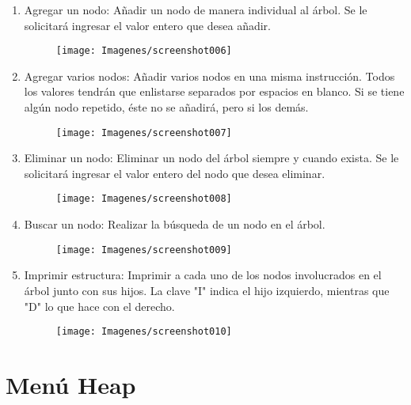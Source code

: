 \documentclass[letterpaper, 11pt]{article}
\begin{document}
	\begin{enumerate}
		\item Agregar un nodo: Añadir un nodo de manera individual al 
		árbol. Se le solicitará ingresar el valor entero que desea añadir.
		
		\begin{figure}[H]
			\centering
			\texttt{[image: Imagenes/screenshot006]}
		\end{figure}
		
		
		\item Agregar varios nodos: Añadir varios nodos en una misma instrucción. Todos los valores tendrán que enlistarse separados por espacios en blanco. Si se tiene algún nodo repetido, éste no se añadirá, pero si los demás.
		
		\begin{figure}[H]
			\centering
			\texttt{[image: Imagenes/screenshot007]}
		\end{figure}
		
		\item Eliminar un nodo: Eliminar un nodo del árbol siempre y cuando exista. Se le solicitará ingresar el valor entero del nodo que desea eliminar.
		
		\begin{figure}[H]
			\centering
			\texttt{[image: Imagenes/screenshot008]}
		\end{figure}
		
		\item Buscar un nodo: Realizar la búsqueda de un nodo en el árbol. 
		
		\begin{figure}[H]
			\centering
			\texttt{[image: Imagenes/screenshot009]}
		\end{figure}
		
		\item Imprimir estructura: Imprimir a cada uno de los nodos involucrados en el árbol junto con sus hijos. La clave "I" indica el hijo izquierdo, mientras que "D" lo que hace con el derecho.
		
		\begin{figure}[H]
			\centering
			\texttt{[image: Imagenes/screenshot010]}
		\end{figure}
	\end{enumerate}

	\newpage
	
	\section*{Menú Heap}
	
\end{document}
